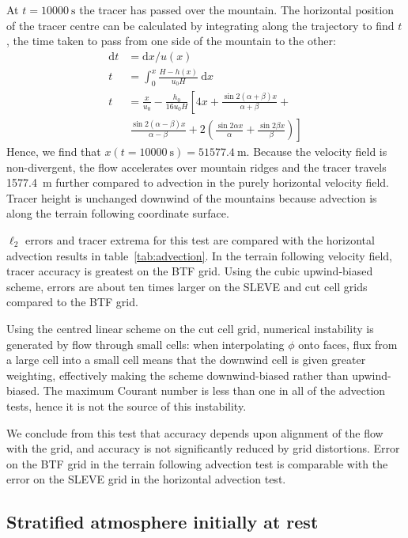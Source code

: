\documentclass{ametsoc}
\begin{document}
At $t = \SI{10000}{\second}$ the tracer has passed over the mountain.  The horizontal position of the tracer centre can be calculated by integrating along the trajectory to find $t$, the time taken to pass from one side of the mountain to the other:
\begin{align}
	\mathrm{d}t &= \mathrm{d}x / u(x) \\
	t &= \int_0^x \frac{H - h(x)}{u_0 H}\:\mathrm{d}x \\
	t &= \frac{x}{u_0} - \frac{h_0}{16 u_0 H} \left[ 4x + \frac{\sin 2 (\alpha + \beta) x}{\alpha + \beta} \right.+ \nonumber \\
   &\ \left. \frac{\sin 2(\alpha - \beta) x}{\alpha - \beta} + 2 \left( \frac{\sin 2\alpha x}{\alpha} + \frac{\sin 2\beta x}{\beta} \right) \right]
\end{align}
Hence, we find that \(x(t=\SI{10000}{\second}) = \SI{51577.4}{\meter}\).  Because the velocity field is non-divergent, the flow accelerates over mountain ridges and the tracer travels \SI{1577.4}{\meter} further compared to advection in the purely horizontal velocity field.  Tracer height is unchanged downwind of the mountains because advection is along the terrain following coordinate surface.

$\ell_2$ errors and tracer extrema for this test are compared with the horizontal advection results in table~\ref{tab:advection}.  In the terrain following velocity field, tracer accuracy is greatest on the BTF grid.  Using the cubic upwind-biased scheme, errors are about ten times larger on the SLEVE and cut cell grids compared to the BTF grid.

Using the centred linear scheme on the cut cell grid, numerical instability is generated by flow through small cells: when interpolating \(\phi\) onto faces, flux from a large cell into a small cell means that the downwind cell is given greater weighting, effectively making the scheme downwind-biased rather than upwind-biased.  The maximum Courant number is less than one in all of the advection tests, hence it is not the source of this instability.

We conclude from this test that accuracy depends upon alignment of the flow with the grid, and accuracy is not significantly reduced by grid distortions.  Error on the BTF grid in the terrain following advection test is comparable with the error on the SLEVE grid in the horizontal advection test.

\subsection{Stratified atmosphere initially at rest}
\label{sec:resting}
\end{document}
